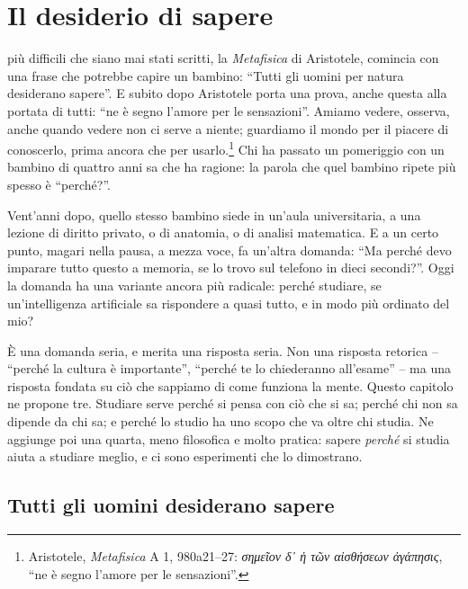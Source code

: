 \chapter{Il desiderio di sapere}
\label{cap:sapere}


 più difficili che siano mai stati scritti,
la \emph{Metafisica} di Aristotele, comincia con una frase che
potrebbe capire un bambino: \enquote{Tutti gli uomini per natura
desiderano sapere}. E subito dopo Aristotele porta una prova, anche
questa alla portata di tutti: \enquote{ne è segno l'amore per le
sensazioni}. Amiamo vedere, osserva, anche quando vedere non ci serve a
niente; guardiamo il mondo per il piacere di conoscerlo, prima ancora
che per usarlo.\footnote{Aristotele, \emph{Metafisica} A 1, 980a21--27:
\emph{σημεῖον δ᾽ ἡ τῶν αἰσθήσεων ἀγάπησις}, \enquote{ne è segno
l'amore per le sensazioni}.} Chi ha passato un pomeriggio con un
bambino di quattro anni sa che ha ragione: la parola che quel bambino
ripete più spesso è \enquote{perché?}.

Vent'anni dopo, quello stesso bambino siede in un'aula universitaria, a
una lezione di diritto privato, o di anatomia, o di analisi matematica.
E a un certo punto, magari nella pausa, a mezza voce, fa un'altra
domanda: \enquote{Ma perché devo imparare tutto questo a memoria, se
lo trovo sul telefono in dieci secondi?}. Oggi la domanda ha una
variante ancora più radicale: perché studiare, se un'intelligenza
artificiale sa rispondere a quasi tutto, e in modo più ordinato del mio?

È una domanda seria, e merita una risposta seria. Non una risposta
retorica -- \enquote{perché la cultura è importante}, \enquote{perché
te lo chiederanno all'esame} -- ma una risposta fondata su ciò che
sappiamo di come funziona la mente. Questo capitolo ne propone tre.
Studiare serve perché si pensa con ciò che si sa; perché chi non sa
dipende da chi sa; e perché lo studio ha uno scopo che va oltre chi
studia. Ne aggiunge poi una quarta, meno filosofica e molto pratica:
sapere \emph{perché} si studia aiuta a studiare meglio, e ci sono
esperimenti che lo dimostrano.

\section{Tutti gli uomini desiderano sapere}

